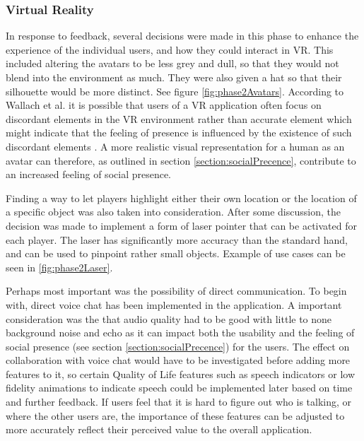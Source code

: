 \subsubsection{Virtual Reality}
In response to feedback, several decisions were made in this phase to enhance the experience of the individual users, and how they could interact in VR. This included altering the avatars to be less grey and dull, so that they would not blend into the environment as much. They were also given a hat so that their silhouette would be more distinct.  See figure \ref{fig:phase2Avatars}.
According  to  Wallach  et  al. it is possible that users of a VR application often focus on discordant elements in the VR environment rather than accurate element which might indicate that the feeling of presence is influenced by the existence of such discordant elements \cite{presenceInVirtualReality:}. A more realistic visual representation for a human as an avatar can therefore, as outlined in section \ref{section:socialPrecence}, contribute to an increased feeling of social presence. 

Finding a way to let players highlight either their own location or the location of a specific object was also taken into consideration. After some discussion, the decision was made to implement a form of laser pointer that can be activated for each player. The laser has significantly more accuracy than the standard hand, and can be used to pinpoint rather small objects. Example of use cases can be seen in \ref{fig:phase2Laser}.

Perhaps most important was the possibility of direct communication. To begin with, direct voice chat has been implemented in the application. A important consideration was the that audio quality had to be good with little to none background noise and echo as it can impact both the usability and the feeling of social presence (see section \ref{section:socialPrecence}) for the users. 
The effect on collaboration with voice chat would have to be investigated before adding more features to it, so certain Quality of Life features such as speech indicators or low fidelity animations to indicate speech could be implemented later based on time and further feedback. If users feel that it is hard to figure out who is talking, or where the other users are, the importance of these features can be adjusted to more accurately reflect their perceived value to the overall application.


